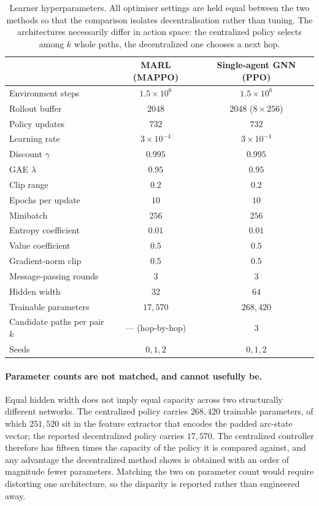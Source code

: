 \begin{table}[h]
\centering
\small
\begin{tabular}{lcc}
\hline
& MARL (MAPPO) & Single-agent GNN (PPO) \\
\hline
Environment steps & $1.5\times10^{6}$ & $1.5\times10^{6}$ \\
Rollout buffer & $2048$ & $2048$ ($8\times256$) \\
Policy updates & $732$ & $732$ \\
Learning rate & $3\times10^{-4}$ & $3\times10^{-4}$ \\
Discount $\gamma$ & $0.995$ & $0.995$ \\
GAE $\lambda$ & $0.95$ & $0.95$ \\
Clip range & $0.2$ & $0.2$ \\
Epochs per update & $10$ & $10$ \\
Minibatch & $256$ & $256$ \\
Entropy coefficient & $0.01$ & $0.01$ \\
Value coefficient & $0.5$ & $0.5$ \\
Gradient-norm clip & $0.5$ & $0.5$ \\
Message-passing rounds & $3$ & $3$ \\
Hidden width & $32$ & $64$ \\
Trainable parameters & $17{,}570$ & $268{,}420$ \\
Candidate paths per pair $k$ & --- (hop-by-hop) & $3$ \\
Seeds & $0,1,2$ & $0,1,2$ \\
\hline
\end{tabular}
\caption{Learner hyperparameters. All optimiser settings are held equal between
the two methods so that the comparison isolates decentralisation rather than
tuning. The architectures necessarily differ in action space: the centralized
policy selects among $k$ whole paths, the decentralized one chooses a next hop.}
\label{tab:hyper}
\end{table}

\paragraph{Parameter counts are not matched, and cannot usefully be.} Equal hidden
width does not imply equal capacity across two structurally different networks.
The centralized policy carries $268{,}420$ trainable parameters, of which
$251{,}520$ sit in the feature extractor that encodes the padded arc-state vector;
the reported decentralized policy carries $17{,}570$. The centralized controller
therefore has fifteen times the capacity of the policy it is compared against, and any advantage the decentralized method
shows is obtained with an order of magnitude fewer parameters. Matching the two
on parameter count would require distorting one architecture, so the disparity is
reported rather than engineered away.

